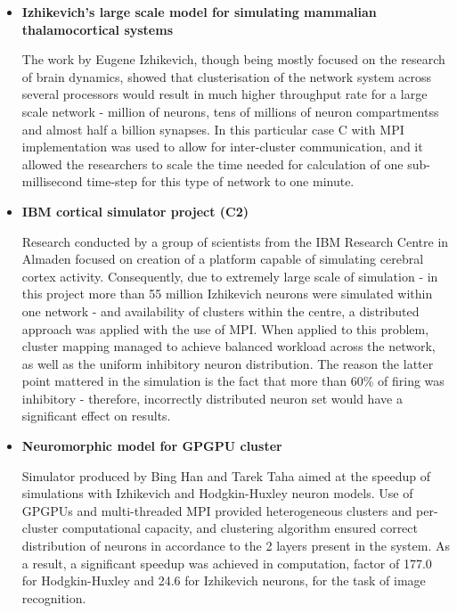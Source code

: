\begin{itemize}
\item{\textbf{Izhikevich's large scale model for simulating mammalian thalamocortical systems}}

The work by Eugene Izhikevich\cite{EugeneM.Izhikevich2008}, though being mostly focused on the research of brain dynamics, showed that clusterisation of the network system across several processors would result in much higher throughput rate for a large scale network - million of neurons, tens of millions of neuron compartmentss and almost half a billion synapses. In this particular case C with MPI implementation was used to allow for inter-cluster communication, and it allowed the researchers to scale the time needed for calculation of one sub-millisecond time-step for this type of network to one minute.

\item{\textbf{IBM cortical simulator project (C2)}}

Research conducted by a group of scientists from the IBM Research Centre in Almaden\cite{DharmendraS.Modha2007} focused on creation of a platform capable of simulating cerebral cortex activity. Consequently, due to extremely large scale of simulation - in this project more than 55 million Izhikevich neurons were simulated within one network - and availability of clusters within the centre, a distributed approach was applied with the use of MPI. When applied to this problem, cluster mapping managed to achieve balanced workload across the network, as well as the uniform inhibitory neuron distribution. The reason the latter point mattered in the simulation is the fact that more than 60\% of firing was inhibitory - therefore, incorrectly distributed neuron set would have a significant effect on results.

\item{\textbf{Neuromorphic model for GPGPU cluster}}

Simulator produced by Bing Han and Tarek Taha aimed at the speedup of simulations with Izhikevich and Hodgkin-Huxley neuron models\cite{TarekM.Taha2010}. Use of GPGPUs and multi-threaded MPI provided heterogeneous  clusters and per-cluster computational capacity, and clustering algorithm ensured correct distribution of neurons in accordance to the 2 layers present in the system. As a result, a significant speedup was achieved in computation, factor of 177.0 for Hodgkin-Huxley and 24.6 for Izhikevich neurons, for the task of image recognition.
\end{itemize}
